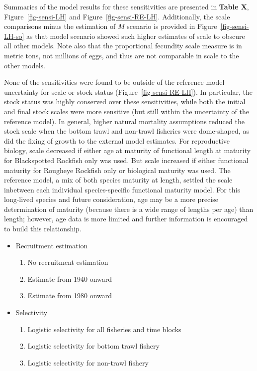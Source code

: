 \documentclass[
]{scrartcl}
\providecommand{\tightlist}{%
  \setlength{\itemsep}{0pt}\setlength{\parskip}{0pt}}\usepackage{longtable,booktabs,array}
\begin{document}
Summaries of the model results for these sensitivities are presented in
\textbf{Table X}, Figure~\ref{fig-sensi-LH} and
Figure~\ref{fig-sensi-RE-LH}. Additionally, the scale comparisons minus
the estimation of \(M\) scenario is provided in
Figure~\ref{fig-sensi-LH-so} as that model scenario showed such higher
estimates of scale to obscure all other models. Note also that the
proportional fecundity scale measure is in metric tons, not millions of
eggs, and thus are not comparable in scale to the other models.

None of the sensitivities were found to be outside of the reference
model uncertainty for scale or stock status
(Figure~\ref{fig-sensi-RE-LH}). In particular, the stock status was
highly conserved over these sensitivities, while both the initial and
final stock scales were more sensitive (but still within the uncertainty
of the reference model). In general, higher natural mortality
assumptions reduced the stock scale when the bottom trawl and non-trawl
fisheries were dome-shaped, as did the fixing of growth to the external
model estimates. For reproductive biology, scale decreased if either age
at maturity of functional length at maturity for Blackspotted Rockfish
only was used. But scale increased if either functional maturity for
Rougheye Rockfish only or biological maturity was used. The reference
model, a mix of both species maturity at length, settled the scale
inbetween each individual species-specific functional maturity model.
For this long-lived species and future consideration, age may be a more
precise determination of maturity (because there is a wide range of
lengths per age) than length; however, age data is more limited and
further information is encouraged to build this relationship.

\begin{itemize}
\item
  Recruitment estimation

  \begin{enumerate}
  \def\labelenumi{\arabic{enumi}.}
  \setcounter{enumi}{12}
  \tightlist
  \item
    No recruitment estimation
  \item
    Estimate from 1940 onward
  \item
    Estimate from 1980 onward
  \end{enumerate}
\item
  Selectivity

  \begin{enumerate}
  \def\labelenumi{\arabic{enumi}.}
  \setcounter{enumi}{15}
  \tightlist
  \item
    Logistic selectivity for all fisheries and time blocks
  \item
    Logistic selectivity for bottom trawl fishery
  \item
    Logistic selectivity for non-trawl fishery
  \end{enumerate}
\end{itemize}
\end{document}
